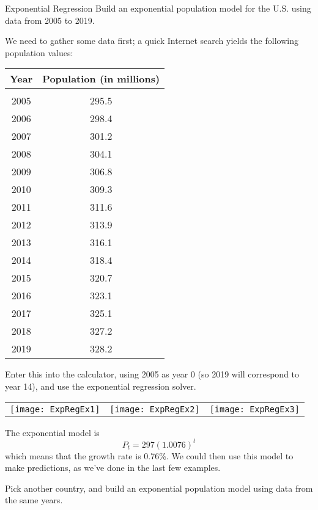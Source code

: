 \begin{example}[https://www.youtube.com/watch?v=0dJtDjAWn6w&list=PLfmpjsIzhztutjEb8Pg5OBOlI1p80yVoy&index=12]{Exponential Regression}
Build an exponential population model for the U.S. using data from 2005 to 2019.

\sol
We need to gather some data first; a quick Internet search yields the following population values:
\begin{center}
\begin{tabular}{c c}
\textbf{Year} & \textbf{Population (in millions)}\\
\hline
& \\
2005 & 295.5\\
2006 & 298.4\\
2007 & 301.2\\
2008 & 304.1\\
2009 & 306.8\\
2010 & 309.3\\
2011 & 311.6\\
2012 & 313.9\\
2013 & 316.1\\
2014 & 318.4\\
2015 & 320.7\\
2016 & 323.1\\
2017 & 325.1\\
2018 & 327.2\\
2019 & 328.2
\end{tabular}
\end{center}

Enter this into the calculator, using 2005 as year 0 (so 2019 will correspond to year 14), and use the exponential regression solver.
\begin{center}
\begin{tabular}{c c c}
\texttt{[image: ExpRegEx1]}
& \texttt{[image: ExpRegEx2]}
& \texttt{[image: ExpRegEx3]}
\end{tabular}
\end{center}

The exponential model is \[\boxed{P_t = 297(1.0076)^t}\] which means that the growth rate is 0.76\%.  We could then use this model to make predictions, as we've done in the last few examples.
\end{example}

\begin{try}
Pick another country, and build an exponential population model using data from the same years.
\end{try}
\pagebreak


